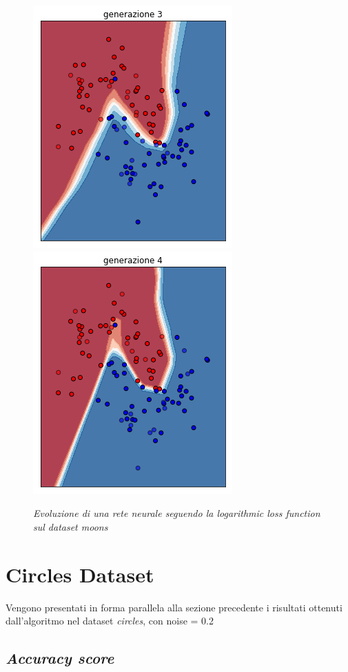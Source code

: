 \documentclass[12pt,a4paper]{report}
\begin{document}
\begin{figure}[H]
 \includegraphics[scale = 0.3]{images/moons-rnd-log./3}
 \includegraphics[scale = 0.3]{images/moons-rnd-log./4}
 \caption{\textit{Evoluzione di una rete neurale seguendo la logarithmic loss function sul dataset moons}}
 \label{moons3}
\end{figure}

\section{Circles Dataset}

Vengono presentati in forma parallela alla sezione precedente i risultati ottenuti dall'algoritmo nel dataset \textit{circles}, con noise = 0.2

\subsection{\textit{Accuracy score}}
\end{document}
